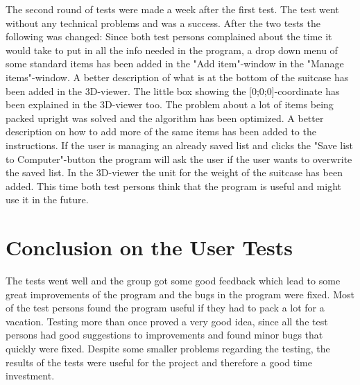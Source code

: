 The second round of tests were made a week after the first test. The test went without any technical problems and was a success. After the two tests the following was changed: Since both test persons complained about the time it would take to put in all the info needed in the program, a drop down menu of some standard items has been added in the "Add item"-window in the "Manage items"-window. A better description of what is at the bottom of the suitcase has been added in the 3D-viewer. The little box showing the [0;0;0]-coordinate has been explained in the 3D-viewer too. The problem about a lot of items being packed upright was solved and the algorithm has been optimized. A better description on how to add more of the same items has been added to the instructions. If the user is managing an already saved list and clicks the "Save list to Computer"-button the program will ask the user if the user wants to overwrite the saved list. In the 3D-viewer the unit for the weight of the suitcase has been added. This time both test persons think that the program is useful and might use it in the future.

\section{Conclusion on the User Tests}
The tests went well and the group got some good feedback which lead to some great improvements of the program and the bugs in the program were fixed. Most of the test persons found the program useful if they had to pack a lot for a vacation. Testing more than once proved a very good idea, since all the test persons had good suggestions to improvements and found minor bugs that quickly were fixed. Despite some smaller problems regarding the testing, the results of the tests were useful for the project and therefore a good time investment.